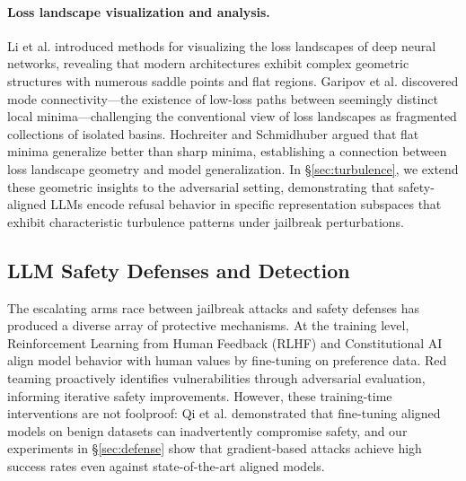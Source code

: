 ﻿\documentclass[lettersize,journal]{IEEEtran}
\begin{document}
\paragraph{Loss landscape visualization and analysis.} Li et al. \cite{li2018visualizing} introduced methods for visualizing the loss landscapes of deep neural networks, revealing that modern architectures exhibit complex geometric structures with numerous saddle points and flat regions. Garipov et al. \cite{garipov2018loss} discovered mode connectivity---the existence of low-loss paths between seemingly distinct local minima---challenging the conventional view of loss landscapes as fragmented collections of isolated basins. Hochreiter and Schmidhuber \cite{hochreiter1997flat} argued that flat minima generalize better than sharp minima, establishing a connection between loss landscape geometry and model generalization. In \S\ref{sec:turbulence}, we extend these geometric insights to the adversarial setting, demonstrating that safety-aligned LLMs encode refusal behavior in specific representation subspaces that exhibit characteristic turbulence patterns under jailbreak perturbations.

\subsection{LLM Safety Defenses and Detection}
\label{sec:rw_defense}

The escalating arms race between jailbreak attacks and safety defenses has produced a diverse array of protective mechanisms. At the training level, Reinforcement Learning from Human Feedback (RLHF) \cite{ouyang2022training} and Constitutional AI \cite{bai2022constitutional} align model behavior with human values by fine-tuning on preference data. Red teaming \cite{perez2022red} proactively identifies vulnerabilities through adversarial evaluation, informing iterative safety improvements. However, these training-time interventions are not foolproof: Qi et al. \cite{qi2023fine} demonstrated that fine-tuning aligned models on benign datasets can inadvertently compromise safety, and our experiments in \S\ref{sec:defense} show that gradient-based attacks achieve high success rates even against state-of-the-art aligned models.
\end{document}
